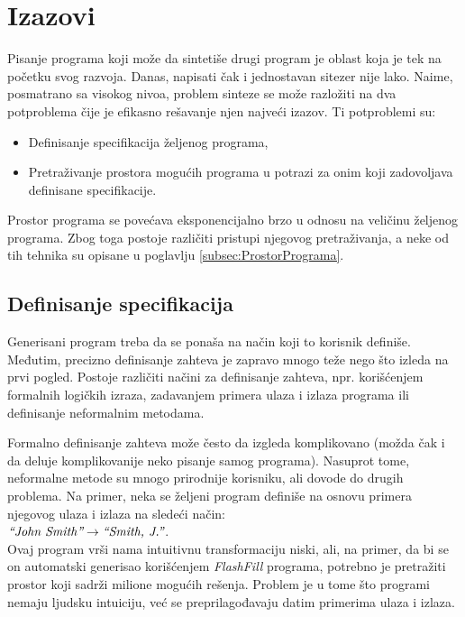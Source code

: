 \section{Izazovi}
\label{sec:Izazovi}

Pisanje programa koji može da sintetiše drugi program je oblast koja je tek na početku svog razvoja. Danas, napisati čak i jednostavan sitezer nije lako. Naime, posmatrano sa visokog nivoa, problem sinteze se može razložiti na dva potproblema čije je efikasno rešavanje njen najveći izazov. Ti potproblemi su:

\begin{itemize}
    \item Definisanje specifikacija željenog programa,
    \item Pretraživanje prostora mogućih programa u potrazi za onim koji zadovoljava definisane specifikacije.
\end{itemize}

Prostor programa se povećava eksponencijalno brzo u odnosu na ve\-li\-či\-nu željenog programa. Zbog toga postoje različiti pristupi njegovog pretraživanja, a neke od tih tehnika su opisane u poglavlju \ref{subsec:ProstorPrograma}.

\subsection{Definisanje specifikacija}
\label{subsec:DefinisanjeSpecifikacija}

Generisani program treba da se ponaša na način koji to korisnik definiše. Međutim, precizno definisanje zahteva je zapravo mnogo teže nego što izleda na prvi pogled. Postoje različiti načini za definisanje zahteva, npr. korišćenjem formalnih logičkih izraza, zadavanjem primera ulaza i izlaza programa ili definisanje neformalnim metodama.

Formalno definisanje zahteva može često da izgleda ko\-mpli\-ko\-va\-no (mo\-žda čak i da deluje komplikovanije neko pisanje samog programa). Nasuprot tome, neformalne metode su mnogo prirodnije korisniku, ali dovode do drugih problema. Na primer, neka se željeni program definiše na osnovu primera njegovog ulaza i izlaza na sledeći način: \\
\(\emph{“John Smith”} \rightarrow \emph{“Smith, J.”}\).\\
Ovaj program vrši nama intuitivnu transformaciju niski, ali, na primer, da bi se on automatski generisao korišćenjem \emph{FlashFill} \cite{FlashFill} programa, potrebno je pretražiti prostor koji sadrži milione mogućih rešenja. Problem je u tome što programi nemaju ljudsku intuiciju, već se preprilagođavaju datim primerima ulaza i izlaza.

